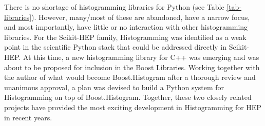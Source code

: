 \documentclass{webofc}
\begin{document}
There is no shortage of histogramming libraries for Python (see Table \ref{tab-libraries}). However, many/most of these are abandoned, have a narrow focus, and most importantly, have little or no interaction with other histogramming libraries. For the Scikit-HEP family, Histogramming was identified as a weak point in the scientific Python stack that could be addressed directly in Scikit-HEP. At this time, a new histogramming library for C++ was emerging and was about to be proposed for inclusion in the Boost Libraries. Working together with the author of what would become Boost.Histogram after a thorough review and unanimous approval, a plan was devised to build a Python system for Histogramming on top of Boost.Histogram. Together, these two closely related projects have provided the most exciting development in Histogramming for HEP in recent years.
\end{document}
